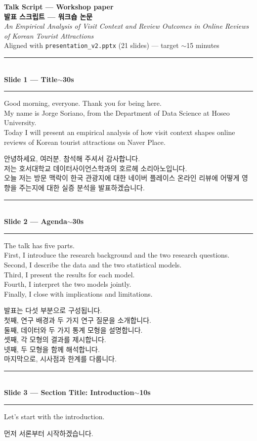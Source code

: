 \documentclass[10pt,a4paper]{article}
\newcommand{\sechead}[2]{%
  \vspace{6pt}%
  \noindent\rule{\linewidth}{0.6pt}\\[1pt]
  {\small\bfseries #1\hfill #2}\\[-3pt]
  \rule{\linewidth}{0.4pt}\par\vspace{2pt}%
}
\newcommand{\sent}[1]{#1\\[5pt]}
\newcommand{\bilingual}[2]{%
  \noindent%
  \begin{minipage}[t]{0.485\linewidth}
    \small #1
  \end{minipage}\hfill\vrule\hfill%
  \begin{minipage}[t]{0.483\linewidth}
    \small #2
  \end{minipage}\par\vspace{4pt}%
}
\begin{document}
\begin{center}
  {\large\bfseries Talk Script --- Workshop paper}\\[3pt]
  {\large\bfseries 발표 스크립트 --- 워크숍 논문}\\[2pt]
  {\small \textit{An Empirical Analysis of Visit Context and Review Outcomes
  in Online Reviews of Korean Tourist Attractions}}\\[2pt]
  {\small Aligned with \texttt{presentation\_v2.pptx} (21 slides) ---
  target $\sim$15 minutes}
\end{center}

\vspace{4pt}

\sechead{Slide 1 --- Title}{$\sim$30s}

\bilingual{%
\sent{Good morning, everyone. Thank you for being here.}
\sent{My name is Jorge Soriano, from the Department of Data Science
at Hoseo University.}
\sent{Today I will present an empirical analysis of how visit context
shapes online reviews of Korean tourist attractions on Naver Place.}
}{%
\sent{안녕하세요, 여러분. 참석해 주셔서 감사합니다.}
\sent{저는 호서대학교 데이터사이언스학과의 호르헤 소리아노입니다.}
\sent{오늘 저는 방문 맥락이 한국 관광지에 대한 네이버 플레이스 온라인
리뷰에 어떻게 영향을 주는지에 대한 실증 분석을 발표하겠습니다.}
}

\sechead{Slide 2 --- Agenda}{$\sim$30s}

\bilingual{%
\sent{The talk has five parts.}
\sent{First, I introduce the research background and the two research
questions.}
\sent{Second, I describe the data and the two statistical models.}
\sent{Third, I present the results for each model.}
\sent{Fourth, I interpret the two models jointly.}
\sent{Finally, I close with implications and limitations.}
}{%
\sent{발표는 다섯 부분으로 구성됩니다.}
\sent{첫째, 연구 배경과 두 가지 연구 질문을 소개합니다.}
\sent{둘째, 데이터와 두 가지 통계 모형을 설명합니다.}
\sent{셋째, 각 모형의 결과를 제시합니다.}
\sent{넷째, 두 모형을 함께 해석합니다.}
\sent{마지막으로, 시사점과 한계를 다룹니다.}
}

\sechead{Slide 3 --- Section Title: Introduction}{$\sim$10s}

\bilingual{%
\sent{Let's start with the introduction.}
}{%
\sent{먼저 서론부터 시작하겠습니다.}
}
\end{document}
